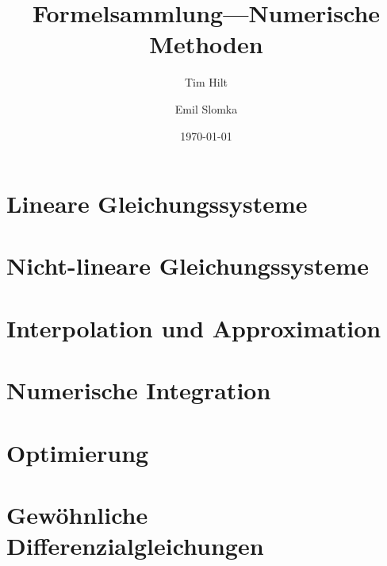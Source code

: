 \documentclass[a4paper, twoside]{article}
\title{Formelsammlung---Numerische Methoden}
\author{Tim Hilt \and Emil Slomka}
\date{\today}
\begin{document}
    
\maketitle
\tableofcontents

\section{Lineare Gleichungssysteme}

\section{Nicht-lineare Gleichungssysteme}

\section{Interpolation und Approximation}

\section{Numerische Integration}

\section{Optimierung}

\section{Gewöhnliche Differenzialgleichungen}
\end{document}
